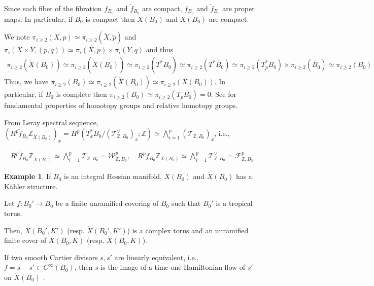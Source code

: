 \documentclass[a4paper,dvipdfmx,reqno,12pt]{amsart}
\theoremstyle{definition}
\newtheorem{Eg}[Thm]{Example}
\newcommand{\Z}{\mathbb{Z}}%
\newcommand{\mcal}[1]{\mathcal{#1}}%
\newcommand{\TBZ}{\mcal{T}_{\Z,B_0}}
\numberwithin{equation}{section}
\begin{document}
Since each fiber of the fibration $f_{B_0}$ and $\check{f}_{B_0}$ are compact, $f_{B_0}$ and $\check{f}_{B_0}$ are proper maps. In particular, if $B_0$ is compact then $\check{X}(B_0)$ and $X(B_0)$ are compact.



We note $\pi_{i\geq 2}(X,p)\simeq \pi_{i\geq 2}(\widetilde{X},\tilde{p})$ and $\pi_{i}(X\times Y,(p,q))\simeq \pi_i(X,p)\times \pi_i(Y,q)$ and thus
\begin{align}
  \pi_{i\geq 2}(\check{X}(B_0))\simeq \pi_{i\geq 2}(\widetilde{\check{X}(B_0)})\simeq \pi_{i\geq 2}(\widetilde{T^{*}B_0})\simeq \pi_{i\geq 2}(T^{*}\widetilde{B_0})\simeq  \pi_{i\geq 2}(T_p^* B_0)\times \pi_{i\geq 2}(\widetilde{B_0})\simeq \pi_{i\geq 2}(B_0)
\end{align}
Thus, we have $\pi_{i\geq 2}(B_0)\simeq \pi_{i\geq 2}(\check{X}(B_0))\simeq \pi_{i\geq 2}(X(B_0))$. In particular, if $B_0$ is complete then $\pi_{i\geq 2}(B_0)\simeq \pi_{i\geq 2}(T_{p}B_0)=0$. See \cite[Chapter 4]{hatcherAlgebraicTopology2002a} for fundamental properties of homotopy groups and relative homotopy groups.

From Leray spectral sequence, $(R^{p}\check{f}_{B_0}\Z_{\check{X}(B_0)})_{x}=H^{p}(T^{*}_xB_0/(\TBZ^{\vee})_x;\Z)\simeq \bigwedge_{i=1}^{p}(\TBZ)_{x}$, i.e.,

\begin{align}
  R^{p}\check{f}_{B_0}\Z_{\check{X}(B_0)}\simeq \bigwedge_{i=1}^{p} \TBZ=\mcal{W}^{p}_{\Z,B_0}, \quad R^{p}f_{B_0}\Z_{X(B_0)}\simeq \bigwedge_{i=1}^{p} \TBZ^{\vee}=\mcal{F}_{\Z,B_0}^{p}
\end{align}

\begin{Eg}
If $B_0$ is an integral Hessian manifold, 
$X(B_0)$ and $\check{X}(B_0)$ has a K\"ahler structure.

Let $f:B_0' \to B_0$ be a finite unramified covering of $B_0$ such that $B_0'$ is a tropical torus.

Then, $X(B_0',K')$ (resp. $\check{X}(B_0',K')$) 
is a complex torus and an unramified finite cover 
of $X(B_0,K)$ (resp. $\check{X}(B_0,K)$).

\end{Eg}
If two smooth Cartier divisors $s,s'$ are linearly equivalent, 
i.e., $f=s-s'\in C^{\infty}(B_0)$, 
then $s$ is the image of a time-one Hamiltonian flow of $s'$
on $\check{X}(B_0)$
\cite[Exercise 6.65]{aspinwallDirichletBranesMirror2009}.




\printindex
\end{document}
